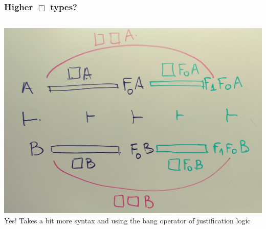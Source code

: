 \documentclass{beamer}
\begin{document}
    \begin{frame}
      \frametitle{Higher $\Box$ types?}
      \begin{columns}
      \includegraphics[scale=0.05]{pics/20171111_141413_Film1}
          Yes! Takes  a bit more syntax and using the bang operator of justification logic
    \end{columns}
      \end{frame}
\end{document}
